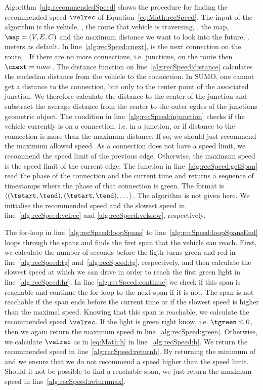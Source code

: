 Algorithm~\ref{alg.recommendedSpeed} shows the procedure for finding the recommended speed $\velrec$ of Equation~\ref{eq:Math:recSpeed}.
The input of the algorithm is the vehicle, \veh, the route that vehicle is traversing, \route, the map, $\map = (V, E, C)$ and the maximum distance we want to look into the future, \distmax. 
 meters as default. %
In line~\ref{alg:recSpeed:cnext}, \cnext is the next connection on the route, \route. If there are no more connections, i.e. junctions, on the route then $\cnext=none$.
The distance function on line~\ref{alg:recSpeed:distance} calculates the eucledian distance from the vehicle to the connection.
In SUMO, one cannot get a distance to the connection, but only to the center point of the associated junction.
We therefore calculate the distance to the center of the junction and substract the average distance from the center to the outer egdes of the junctions geometric object. 
The condition in line~\ref{alg:recSpeed:injunction} checks if the vehicle currently is on a connection, i.e. in a junction, or if distance to the connection is more than the maximum distance. 
If so, we should just recommend the maximum allowed speed. 
As a connection does not have a speed limit, we recommend the speed limit of the previous edge.
Otherwise, the maximum speed is the speed limit of the current edge.
The function \getSpan{\cnext, \ti} in line~\ref{alg:recSpeed:getSpan} read the phase of the connection and the current time and returns a sequence of timestamps where the phase of that connection is green. The format is $\langle(\tstart, \tend), (\tstart, \tend), \dots\rangle$.
The algorithm is not given here.
We initialise the recommended speed and the slowest speed in line~\ref{alg:recSpeed:velrec} and \ref{alg:recSpeed:velslow}, respectively.

The for-loop in line~\ref{alg:recSpeed:loopSpans} to line~\ref{alg:recSpeed:loopSpansEnd} loops through the spans and finds the first span that the vehicle can reach.
First, we calculate the number of seconds before the ligth turns green and red in line~\ref{alg:recSpeed:tg} and~\ref{alg:recSpeed:tg}, respectively, and then calculate the slowest speed at which we can drive in order to reach the first green light in line~\ref{alg:recSpeed:hr}.
In line \ref{alg:recSpeed:continue} we check if this span is reachable and continue the for-loop to the next span if it is not. 
The span is not reachable if the span ends before the current time or if the slowest speed is higher than the maximal speed.
Knowing that this span is reachable, we calculate the recommended speed $\velrec$.
If the light is green right know, i.e. $\tgreen \leq 0$, then we again return the maximum speed in line~\ref{alg:recSpeed:green}. 
Otherwise, we calculate $\velrec$ as in \eqref{eq:Math:h} in line~\ref{alg:recSpeed:h}.
We return the recommended speed in line~\ref{alg:recSpeed:returnh}.
By returning the minimum of \velrec and \velmax we ensure that we do not recommend a speed higher than the speed limit.
Should it not be possible to find a reachable span, we just return the maximum speed in line~\ref{alg:recSpeed:returnmax}.

